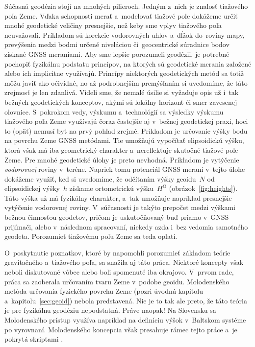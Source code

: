 \documentclass[a4paper, 12pt]{book}
\begin{document}
Súčasná geodézia stojí na mnohých pilieroch.  Jedným z~nich je znalosť 
tiažového poľa Zeme.  Vďaka schopnosti merať a~modelovať tiažové pole dokážeme 
určiť mnohé geodetické veličiny presnejšie, než keby sme vplyv tiažového poľa 
neuvažovali.  Príkladom sú korekcie vodorovných uhlov a~dĺžok do~roviny mapy, 
prevýšenia medzi bodmi určené niveláciou či~geocentrické súradnice bodov 
získané GNSS meraniami.  Aby sme lepšie porozumeli geodézii, je potrebné 
pochopiť fyzikálnu podstatu princípov, na ktorých sú geodetické merania 
založené alebo ich implicitne využívajú.  Princípy niektorých geodetických 
metód sa totiž môžu javiť ako očividné, no až podrobnejším premýšľaním si 
uvedomíme, že táto zrejmosť je len zdanlivá.  Videli sme, že nemalé úsilie si 
vyžaduje opis už i~tak bežných geodetických konceptov, akými sú lokálny 
horizont či smer zavesenej olovnice.  S~pokrokom vedy, výskumu a~technológií sa 
výsledky výskumu tiažového poľa Zeme využívajú čoraz častejšie aj v~bežnej 
geodetickej praxi, hoci to (opäť) nemusí byť na prvý pohlaď zrejmé.  Príkladom 
je určovanie výšky bodu na povrchu Zeme GNSS metódami.  Tie umožňujú vypočítať 
elipsoidickú výšku, ktorá však má iba geometrický charakter a~nereflektuje 
skutočné tiažové pole Zeme.  Pre mnohé geodetické úlohy je preto nevhodná.  
Príkladom je vytýčenie \emph{vodorovnej} roviny v~teréne.  Napriek tomu 
potenciál GNSS meraní v~tejto úlohe dokážeme využiť, keď si uvedomíme, že 
odčítaním výšky geoidu~$N$ od elipsoidickej výšky~$h$ získame ortometrickú 
výšku~$H^\mathrm{O}$ (obrázok~\ref{fig:heights}).  Táto výška už má fyzikálny 
charakter, a~tak umožňuje napríklad presnejšie vytýčenie vodorovnej roviny.  
V~súčasnosti je takýto prepočet medzi výškami bežnou činnosťou geodetov, pričom 
je uskutočňovaný buď priamo v~GNSS prijímači, alebo v~následnom spracovaní, 
niekedy azda i~bez vedomia samotného geodeta.  Porozumieť tiažovému poľu Zeme 
sa teda oplatí.

O~poskytnutie poznatkov, ktoré by napomohli porozumieť základom teórie 
gravitačného a~tiažového poľa, sa snažila aj táto práca.  Niektoré koncepty 
však neboli diskutované vôbec alebo boli spomenuté iba okrajovo.  V~prvom rade, 
práca sa zaoberala určovaním tvaru Zeme v~podobe geoidu.  Molodenského metóda 
určovania fyzického povrchu Zeme (pozri úvodnú kapitolu 
a~kapitolu~\ref{sec:geoid}) nebola predstavená.  Nie je to tak ale preto, že 
táto teória je pre fyzikálnu geodéziu nepodstatná.  Práve naopak!  Na Slovensku 
sa Molodenského prístup využíva napríklad na definíciu výšok v~Baltskom systéme 
po vyrovnaní.  Molodenského koncepcia však presahuje rámec tejto práce a~je 
pokrytá skriptami \textcite{Janak2006}.
\end{document}

